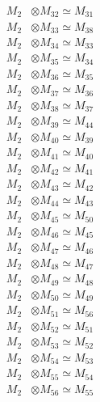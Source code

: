 \begin{align*}
M_{2} &\otimes M_{32} \simeq M_{31} \\
M_{2} &\otimes M_{33} \simeq M_{38} \\
M_{2} &\otimes M_{34} \simeq M_{33} \\
M_{2} &\otimes M_{35} \simeq M_{34} \\
M_{2} &\otimes M_{36} \simeq M_{35} \\
M_{2} &\otimes M_{37} \simeq M_{36} \\
M_{2} &\otimes M_{38} \simeq M_{37} \\
M_{2} &\otimes M_{39} \simeq M_{44} \\
M_{2} &\otimes M_{40} \simeq M_{39} \\
M_{2} &\otimes M_{41} \simeq M_{40} \\
M_{2} &\otimes M_{42} \simeq M_{41} \\
M_{2} &\otimes M_{43} \simeq M_{42} \\
M_{2} &\otimes M_{44} \simeq M_{43} \\
M_{2} &\otimes M_{45} \simeq M_{50} \\
M_{2} &\otimes M_{46} \simeq M_{45} \\
M_{2} &\otimes M_{47} \simeq M_{46} \\
M_{2} &\otimes M_{48} \simeq M_{47} \\
M_{2} &\otimes M_{49} \simeq M_{48} \\
M_{2} &\otimes M_{50} \simeq M_{49} \\
M_{2} &\otimes M_{51} \simeq M_{56} \\
M_{2} &\otimes M_{52} \simeq M_{51} \\
M_{2} &\otimes M_{53} \simeq M_{52} \\
M_{2} &\otimes M_{54} \simeq M_{53} \\
M_{2} &\otimes M_{55} \simeq M_{54} \\
M_{2} &\otimes M_{56} \simeq M_{55} \\
\end{align*}

